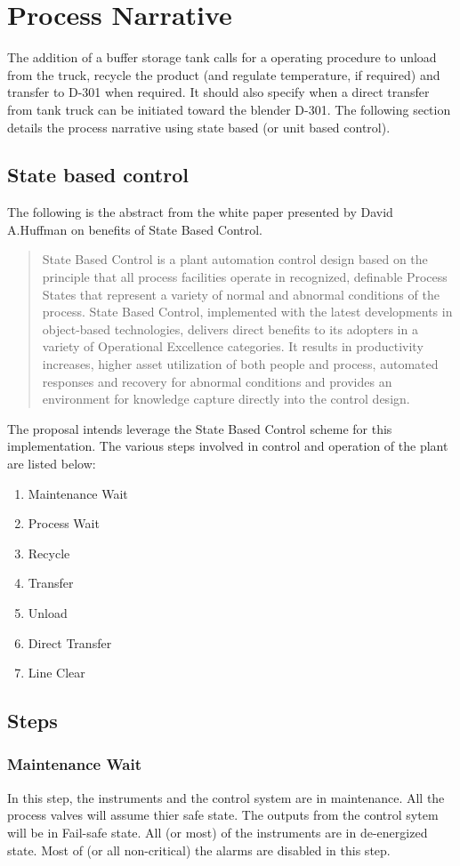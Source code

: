 \documentclass[a4paper,oneside]{article}
\begin{document}
\section{Process Narrative}
\label{sec:org6c80278}
The addition of a buffer storage tank calls for a operating procedure
to unload from the truck, recycle the product (and regulate
temperature, if required) and transfer to D-301 when required. It
should also specify when a direct transfer from tank truck can be
initiated toward the blender D-301. The following section details the
process narrative using state based (or unit based control).
\subsection{State based control}
\label{sec:org668eee3}
The following is the abstract from the white paper presented by David
A.Huffman on benefits of State Based Control.
\begin{quote}
State Based Control is a plant automation control design based on the
principle that all process facilities operate in recognized, definable
Process States that represent a variety of normal and abnormal
conditions of the process. State Based Control, implemented with the
latest developments in object-based technologies, delivers direct
benefits to its adopters in a variety of Operational Excellence
categories. It results in productivity increases, higher asset
utilization of both people and process, automated responses and
recovery for abnormal conditions and provides an environment for
knowledge capture directly into the control design.
\end{quote}
The proposal intends leverage the State Based Control scheme for this
implementation. The various steps involved in control and operation of
the plant are listed below: 
\begin{enumerate}
\item Maintenance Wait
\item Process Wait
\item Recycle
\item Transfer
\item Unload
\item Direct Transfer
\item Line Clear
\end{enumerate}
\subsection{Steps}
\label{sec:orgbce35f5}
\subsubsection*{Maintenance Wait}
\label{sec:org1fd2e46}
In this step, the instruments and the control system are in
maintenance. All the process valves will assume thier safe state. The
outputs from the control sytem will be in Fail-safe state. All (or
most) of the instruments are in de-energized state. Most of (or all
non-critical) the alarms are disabled in this step.
\end{document}
